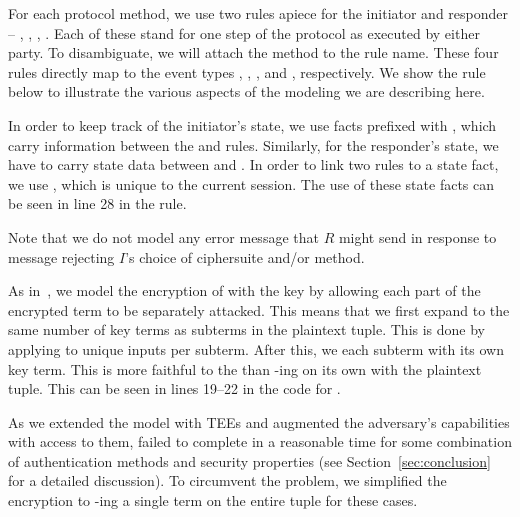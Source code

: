 For each protocol method, we use two rules apiece for the initiator and
responder -- , , , .
%
Each of these stand for one step of the protocol as executed by either party.
%
To disambiguate, we will attach the method to the rule name.
%
These four rules directly map to the event types
\mIStart, \mRStart, \mIComplete, and \mRComplete, respectively.
%
We show the  rule below to illustrate the various aspects
of the \mTamarin{} modeling we are describing here.
%

In order to keep track of the initiator's state, we use facts prefixed with
, which carry information between the  and  rules.
%
Similarly, for the responder's state, we have  to carry state data
between  and .
%
In order to link two rules to a state fact, we use , which
is unique to the current session.
%
The use of these state facts can be seen in line 28 in the  
rule.
%

Note that we do not model any error message that $R$ might send in response
to message \mMsgone rejecting $I$'s choice of ciphersuite and/or method.
%

As in~\cite{Norr21}, we model the \mXor{} encryption of 
 with
the key  by allowing each part of the encrypted term to be
separately attacked.
%
This means that we first expand  to the same number of key terms 
as
subterms in the plaintext tuple.
%
This is done by applying \mHkdfExpand{} to unique inputs per subterm.
%
After this, we \mXor{} each subterm with its own key term.
%
This is more faithful to the \mSpec{} than \mXor-ing  on its own
with the plaintext tuple.
%
This can be seen in lines 19--22 in the code for .
%

As we extended the model with TEEs and augmented the adversary's 
capabilities
with access to them, \mTamarin{} failed to complete in a reasonable time for
some combination of authentication methods and security properties (see 
Section~\ref{sec:conclusion} for a detailed discussion).
%
To circumvent the problem, we simplified the \mXor{} encryption to 
\mXor-ing 
a
single term on the entire tuple for these cases. \\
%

